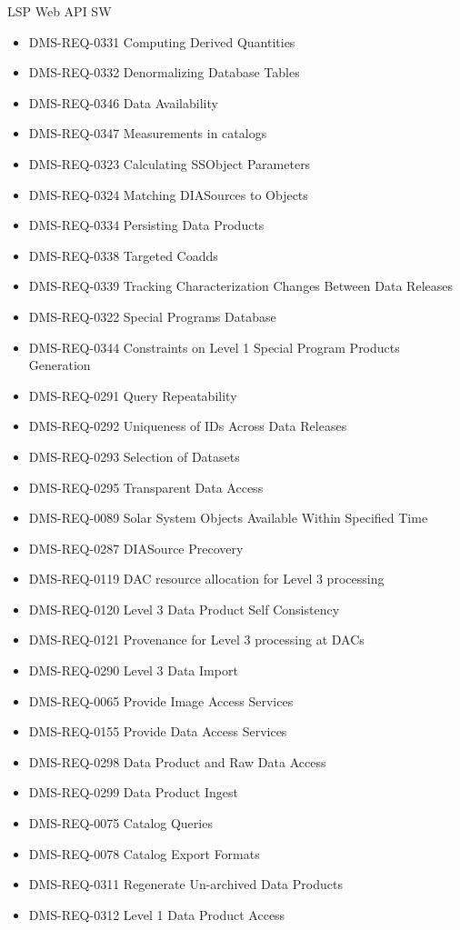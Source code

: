 LSP Web API SW \begin{itemize}
\item DMS-REQ-0331 Computing Derived Quantities
\item DMS-REQ-0332 Denormalizing Database Tables
\item DMS-REQ-0346 Data Availability
\item DMS-REQ-0347 Measurements in catalogs
\item DMS-REQ-0323 Calculating SSObject Parameters
\item DMS-REQ-0324 Matching DIASources to Objects
\item DMS-REQ-0334 Persisting Data Products
\item DMS-REQ-0338 Targeted Coadds
\item DMS-REQ-0339 Tracking Characterization Changes Between Data Releases
\item DMS-REQ-0322 Special Programs Database
\item DMS-REQ-0344 Constraints on Level 1 Special Program Products Generation
\item DMS-REQ-0291 Query Repeatability
\item DMS-REQ-0292 Uniqueness of IDs Across Data Releases
\item DMS-REQ-0293 Selection of Datasets
\item DMS-REQ-0295 Transparent Data Access
\item DMS-REQ-0089 Solar System Objects Available Within Specified Time
\item DMS-REQ-0287 DIASource Precovery
\item DMS-REQ-0119 DAC resource allocation for Level 3 processing
\item DMS-REQ-0120 Level 3 Data Product Self Consistency
\item DMS-REQ-0121 Provenance for Level 3 processing at DACs
\item DMS-REQ-0290 Level 3 Data Import
\item DMS-REQ-0065 Provide Image Access Services
\item DMS-REQ-0155 Provide Data Access Services
\item DMS-REQ-0298 Data Product and Raw Data Access
\item DMS-REQ-0299 Data Product Ingest
\item DMS-REQ-0075 Catalog Queries
\item DMS-REQ-0078 Catalog Export Formats
\item DMS-REQ-0311 Regenerate Un-archived Data Products
\item DMS-REQ-0312 Level 1 Data Product Access

\end{itemize}
